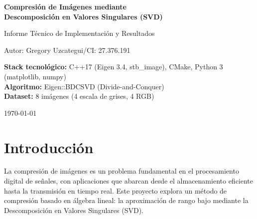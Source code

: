 ﻿\documentclass[12pt,a4paper]{article}
\theoremstyle{definition}
\begin{document}
\begin{titlepage}
    \centering
    \vspace*{2cm}
    {\Huge\bfseries Compresi\'{o}n de Im\'{a}genes mediante\\[0.3cm] Descomposici\'{o}n en Valores Singulares (SVD)\par}
    \vspace{1.5cm}
    {\Large Informe T\'{e}cnico de Implementaci\'{o}n y Resultados\par}
    \vspace{2cm}
    {\Large Autor: Gregory Uzcategui/CI: 27.376.191 \par}
    \vspace{2cm}
    {\large
    \textbf{Stack tecnol\'{o}gico:} C++17 (Eigen 3.4, stb\_image), CMake, Python 3 (matplotlib, numpy)\\[0.5cm]
    \textbf{Algoritmo:} Eigen::BDCSVD (Divide-and-Conquer)\\[0.5cm]
    \textbf{Dataset:} 8 im\'{a}genes (4 escala de grises, 4 RGB)
    \par}
    \vfill
    {\large \today\par}
\end{titlepage}

\begin{abstract}
\noindent
Este informe documenta la implementaci\'{o}n de un sistema de compresi\'{o}n de im\'{a}genes basado en la Descomposici\'{o}n en Valores Singulares (SVD). El n\'{u}cleo computacional se desarroll\'{o} en C++17 utilizando la biblioteca Eigen para \'{a}lgebra lineal, mientras que el an\'{a}lisis cuantitativo y las visualizaciones se generaron con Python. Se evaluaron 8 im\'{a}genes de prueba aplicando aproximaciones de rango bajo $A_k$ con $k \in \{5, 20, 50, 100, 200\}$.
\end{abstract}

\tableofcontents
\newpage

\section{Introducci\'{o}n}\label{sec:intro}

La compresi\'{o}n de im\'{a}genes es un problema fundamental en el procesamiento digital de se\~{n}ales, con aplicaciones que abarcan desde el almacenamiento eficiente hasta la transmisi\'{o}n en tiempo real. Este proyecto explora un m\'{e}todo de compresi\'{o}n basado en \'{a}lgebra lineal: la aproximaci\'{o}n de rango bajo mediante la Descomposici\'{o}n en Valores Singulares (SVD).
\end{document}
